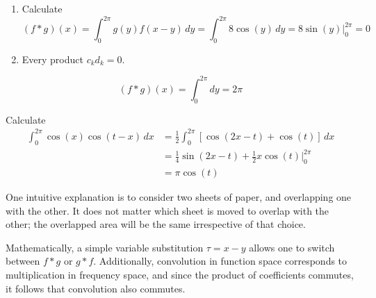 \documentclass[a4paper]{article}
\begin{document}
\begin{enumerate}[label=(\alph*)]
	\item Calculate
	\[
		\!\left( f * g \right)\!\left( x \right) = \int^{2 \pi}_{0} g \!\left( y \right)f \!\left( x - y \right) \, dy = \int^{2 \pi}_{0} 8 \cos\!\left(y\right) \, dy = 8 \sin\!\left(y\right) \Big|^{2 \pi}_{0} = 0 
	\]
	\item Every product \( c_{k}d_{k} = 0 \).
\end{enumerate}


\[
	\!\left( f * g \right)\!\left( x \right) = \int^{2 \pi}_{0} dy = 2 \pi  
\]


Calculate
\begin{align*}
	\int^{2 \pi}_{0} \cos\!\left(x\right) \cos\!\left(t - x\right) \, dx & = \frac{1}{2}\int^{2 \pi}_{0} \!\left[ \cos\!\left(2x - t\right) + \cos\!\left(t\right) \right] \, dx \\
									     & = \frac{1}{4}\sin\!\left(2x - t\right) + \frac{1}{2}x \cos\!\left(t\right) \Big|^{2 \pi}_{0} \\
									     & = \pi \cos\!\left(t\right) 
\end{align*}


One intuitive explanation is to consider two sheets of paper, and overlapping one with the other. It does not matter which sheet is moved to overlap with the other; the overlapped area will be the same irrespective of that choice.

Mathematically, a simple variable substitution \( \tau = x - y \) allows one to switch between \( f * g \) or \( g * f \). Additionally, convolution in function space corresponds to multiplication in frequency space, and since the product of coefficients commutes, it follows that convolution also commutes.
\end{document}
